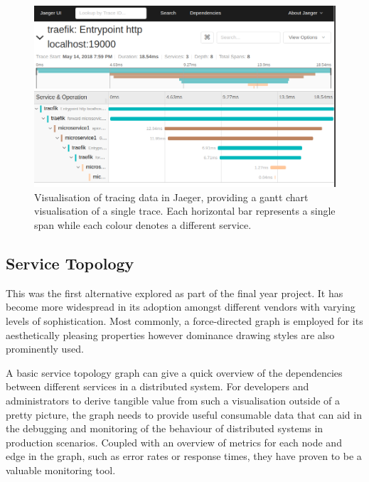 \documentclass[12pt,pdftex,titlepage]{report}
\begin{document}
                \begin{figure}[htb!]
                    \centering
                    \includegraphics[scale=0.38]{jaeger}
                    \caption[Screenshot of the individual trace view in the Jaeger UI]{Visualisation of tracing data in Jaeger\cite{jaeger}, providing
                    a gantt chart visualisation of a single trace. Each horizontal bar represents a single span while each colour denotes
                    a different service.}
                    \label{fig:jaeger}
                \end{figure}
    
            \newpage
            \subsection{Service Topology}
                This was the first alternative explored as part of the final year project. It has become more widespread in its adoption amongst 
                different vendors with varying levels of sophistication\cite{risingstacktopo}\cite{kialitopo}. Most commonly, a force-directed 
                graph is employed for its aesthetically pleasing properties however dominance drawing styles are also prominently used.
        
                A basic service topology graph can give a quick overview of the dependencies between different services in a distributed
                system. For developers and administrators to derive tangible value from such a visualisation outside of a pretty picture, the graph
                needs to provide useful consumable data that can aid in the debugging and monitoring of the behaviour of distributed systems in production
                scenarios. Coupled with an overview of metrics for each node and edge in the graph, such as error rates or response times,
                they have proven to be a valuable monitoring tool.
\end{document}
